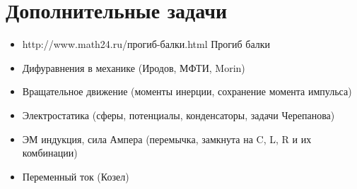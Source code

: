 \section{Дополнительные задачи}
\begin{itemize}
\item http://www.math24.ru/прогиб-балки.html Прогиб балки
\item Дифуравнения в механике (Иродов, МФТИ, Morin)
\item Вращательное движение (моменты инерции, сохранение момента импульса)
\item Электростатика (сферы, потенциалы, конденсаторы, задачи Черепанова)
\item ЭМ индукция, сила Ампера (перемычка, замкнута на C, L, R и их комбинации)
\item Переменный ток (Козел)
\end{itemize}
